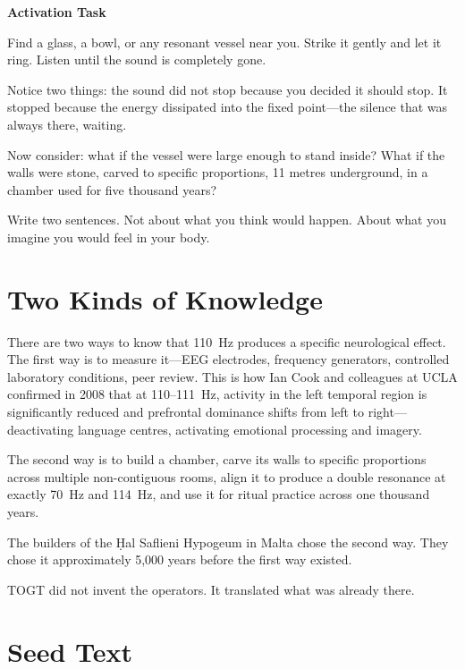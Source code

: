 \documentclass[11pt, twoside, openright]{book}
\theoremstyle{plain}
\theoremstyle{definition}
\newenvironment{activationbox}{%
  \begin{mdframed}[backgroundcolor=AlertBox,linecolor=orange!70,linewidth=0.5pt,innertopmargin=6pt,innerbottommargin=6pt]
  \noindent\textbf{Activation Task}\par\medskip}{\end{mdframed}}
\begin{document}
\begin{activationbox}
Find a glass, a bowl, or any resonant vessel near you. Strike it gently
and let it ring. Listen until the sound is completely gone.

Notice two things: the sound did not stop because you decided it should
stop. It stopped because the energy dissipated into the fixed point---the
silence that was always there, waiting.

Now consider: what if the vessel were large enough to stand inside?
What if the walls were stone, carved to specific proportions, 11 metres
underground, in a chamber used for five thousand years?

Write two sentences. Not about what you think would happen. About what
you imagine you would feel in your body.
\end{activationbox}

\section{Two Kinds of Knowledge}
There are two ways to know that 110~Hz produces a specific neurological
effect. The first way is to measure it---EEG electrodes, frequency
generators, controlled laboratory conditions, peer review. This is how
Ian Cook and colleagues at UCLA confirmed in 2008 that at 110--111~Hz,
activity in the left temporal region is significantly reduced and
prefrontal dominance shifts from left to right---deactivating language
centres, activating emotional processing and imagery.

The second way is to build a chamber, carve its walls to specific
proportions across multiple non-contiguous rooms, align it to produce
a double resonance at exactly 70~Hz and 114~Hz, and use it for ritual
practice across one thousand years.

The builders of the \d{H}al Saflieni Hypogeum in Malta chose the second
way. They chose it approximately 5,000 years before the first way
existed.

TOGT did not invent the operators. It translated what was already there.

\section{Seed Text}
\end{document}

